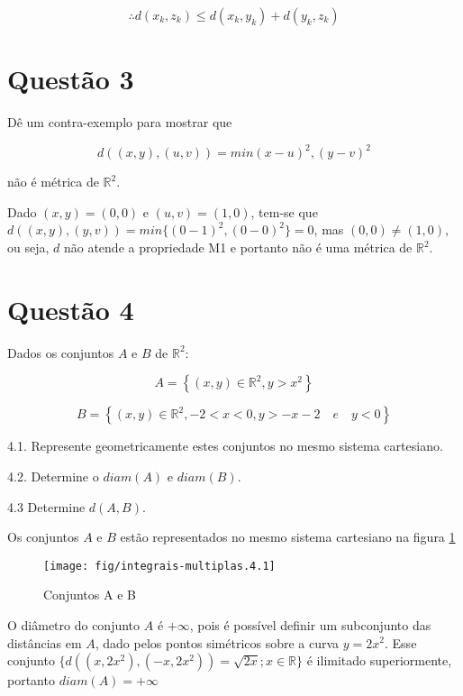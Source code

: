 \documentclass[10pt,a4paper]{article}
\begin{document}
	\begin{equation}\label{eq:M3a}
		\therefore d(x_k, z_k) \le d(x_k, y_k) + d(y_k, z_k)
	\end{equation}
	
	\section*{Questão 3}
	
	Dê um contra-exemplo para mostrar que
	
	\begin{equation}
		d((x, y), (u, v)) = min{(x-u)^2, (y-v)^2}
	\end{equation}
	
	não é métrica de $ \mathbb{R}^2$.
	
	Dado $ (x, y) = (0, 0) $ e $ (u, v) = (1, 0) $, tem-se que $ d((x, y), (y, v)) = min\{(0 - 1)^2, (0-0)^2\} = 0 $, mas $(0, 0) \neq (1, 0) $, ou seja, $d$ não atende a propriedade M1 e portanto não é uma métrica de $ \mathbb{R}^2$.
	\section*{Questão 4}
	
	Dados os conjuntos $A$ e $B$ de $\mathbb{R}^2$:
	
	\begin{equation*}
		A = \left\{ (x, y) \in \mathbb{R}^2, y > x^2 \right\}
	\end{equation*}
	
	\begin{equation*}
		B = \left\{ (x, y) \in \mathbb{R} ^2, -2 < x < 0, y > -x-2 \quad e \quad y < 0 \right\}
	\end{equation*}
	
	4.1. Represente geometricamente estes conjuntos no mesmo sistema cartesiano.
	
	4.2. Determine o $ diam(A) $ e $ diam(B) $.
	
	4.3 Determine $ d(A, B) $.
	
	Os conjuntos $A$ e $B$ estão representados no mesmo sistema cartesiano na figura \ref{fig:integrais-multiplas-4.1}
	
	\begin{figure}[H]
		\centering
		\texttt{[image: fig/integrais-multiplas.4.1]}
		\caption{Conjuntos A e B}
		\label{fig:integrais-multiplas-4.1}
	\end{figure}
	
	
	O diâmetro do conjunto $A$ é $+\infty$, pois é possível definir um subconjunto das distâncias em $A$, dado pelos pontos simétricos sobre a curva $y = 2x^2$. Esse conjunto $\{d((x, 2x^2), (-x, 2x^2) ) = \sqrt{2x}; x \in \mathbb{R}\}$ é ilimitado superiormente, portanto $diam(A) = +\infty$
	
\end{document}
